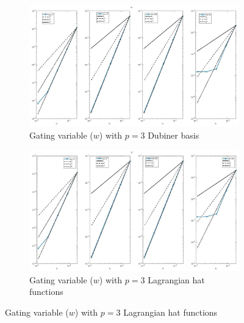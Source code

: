 \documentclass[a4paper,11pt]{article}
\begin{document}
\begin{figure}[H]
\caption{Comparison of the gating variable ($w$)}
\label{w_3}
\begin{subfigure}{\textwidth}
\begin{center}
\includegraphics[width = \textwidth]{./D3_w_1.jpg}
\caption{Gating variable ($w$) with $p=3$ Dubiner basis}
\end{center}
\end{subfigure}
\begin{subfigure}{\textwidth}
\begin{center}
\includegraphics[width =\textwidth]{./P3_w_1.jpg}
\caption{Gating variable ($w$) with $p=3$ Lagrangian hat functions}
\end{center}
\end{subfigure}
\end{figure}
\restoregeometry
\newpage
\end{document}
